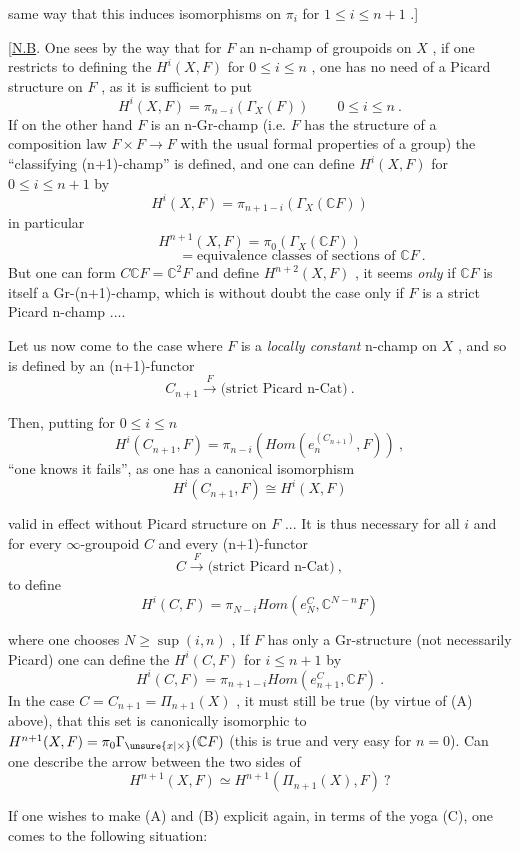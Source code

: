 
same way that this induces isomorphisms on $\pi_i$ for $1 \leq i \leq n + 1$ .]

[\uline{N.B}. One sees by the way that for $F$ an n-champ of groupoids on $X$ ,
if one restricts to defining the $H^i(X, F)$ for $0 \leq i \leq n$ , one has no need
of a Picard structure on $F$ , as it is sufficient to put
\[ H^i(X, F) = \pi_{n-i}(\Gamma_X(F)) \qquad 0 \leq i \leq n \ . \]
If on the other hand $F$ is an n-Gr-champ (i.e. $F$ has the structure of a
composition law $F \times F \rightarrow F$ with the usual formal properties of a group) the
``classifying (n+1)-champ'' is defined, and one can define $H^i(X, F)$ for
$0 \leq i \leq n + 1$ by
\[ H^i(X, F) = \pi_{n+1-i}(\Gamma_X(\mathbb{C}F)) \]
in particular
\[ H^{n+1}(X, F) = \pi_0(\Gamma_X(\mathbb{C}F)) \]
\[ \hspace{6em} = \text{equivalence classes of sections of } \mathbb{C}F \ . \]
But one can form $C\mathbb{C}F = \mathbb{C}^2F$ and define $H^{n+2}(X, F)$ , it seems \textit{only} if $\mathbb{C}F$
is itself a Gr-(n+1)-champ, which is without doubt the case only if $F$ is
a strict Picard n-champ ....

Let us now come to the case where $F$ is a \textit{locally constant} n-champ on
$X$ , and so is defined by an (n+1)-functor
\[ C_{n+1} \xrightarrow{F} \text{(strict Picard n-Cat)} \ . \]

Then, putting for $0 \leq i \leq n$
\[ H^i(C_{n+1}, F) = \pi_{n-i}(\mathit{Hom}(e_n^{(C_{n+1})}, F)) \ , \]
``one knows it fails'', as one has a canonical isomorphism
\[ H^i(C_{n+1}, F) \cong H^i(X, F) \]

valid in effect without Picard structure on $F$ ... It is thus necessary
for all $i$ and for every $\infty$-groupoid $C$ and every (n+1)-functor
\[ C \xrightarrow{F} \text{(strict Picard n-Cat)} \ , \]
to define
\[ H^i(C, F) = \pi_{N-i}\mathit{Hom}(e_N^C, \mathbb{C}^{N-n}F) \]

where one chooses $N \geq \sup(i, n)$ , If $F$ has only a Gr-structure (not
necessarily Picard) one can define the $H^i(C, F)$ for $i \leq n + 1$ by
\[ H^i(C, F) = \pi_{n+1-i}\mathit{Hom}(e^C_{n+1}, \mathbb{C}F) \ . \]
In the case $C = C_{n+1} = \Pi_{n+1}(X)$ , it must still be true (by virtue of (A)
above), that this set is canonically isomorphic to $H^{n+1}(X, F) = \pi_0\Gamma_{\unsure{x|\times}}(\mathbb{C}F)$
(this is true and very easy for $n = 0$). Can one describe the arrow
between the two sides of
\[ H^{n+1}(X, F) \simeq H^{n+1}(\Pi_{n+1}(X), F) \ ? \]

If one wishes to make (A) and (B) explicit again, in terms of the yoga
(C), one comes to the following situation:

